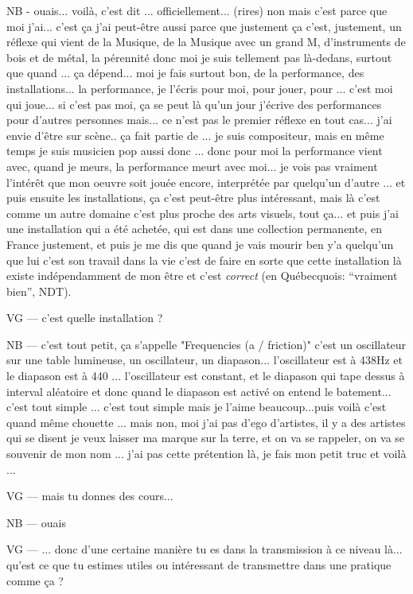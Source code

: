 NB - ouais... voilà, c'est dit ... officiellement... (rires) non mais c'est parce que moi j'ai... c'est ça j'ai peut-être aussi parce que justement ça c'est, justement, un réflexe qui vient de la Musique, de la Musique avec un grand M, d'instruments de bois et de métal, la pérennité donc moi je suis tellement pas là-dedans, surtout que quand ... ça dépend... moi je fais surtout bon, de la performance, des installations... la performance, je l'écris pour moi, pour jouer, pour ... c'est moi qui joue... si c'est pas moi, ça se peut là qu'un jour j'écrive des performances pour d'autres personnes mais... ce n'est pas le premier réflexe en tout cas...  j'ai envie d'être sur scène..  ça fait partie de ... je suis compositeur, mais  en même temps je suis musicien pop aussi donc ... donc pour moi la performance vient avec, quand je meurs, la performance meurt avec moi... je vois pas vraiment l'intérêt que mon oeuvre soit jouée encore, interprétée par quelqu'un d'autre ... et puis ensuite les installations, ça c'est peut-être plus intéressant, mais là c'est comme un autre domaine c'est plus proche des arts visuels, tout ça... et puis j'ai une installation qui a été achetée, qui est dans une collection permanente, en France justement, et puis je me dis que quand je vais mourir ben y'a quelqu'un que lui c'est son travail dans la vie c'est de faire en sorte que cette installation là existe indépendamment de mon être et c'est \textit{correct} (en Québecquois: ``vraiment bien'', NDT).

VG — c'est quelle installation ?

NB — c'est tout petit, ça s'appelle "Frequencies (a / friction)"  c'est un oscillateur sur une table lumineuse, un oscillateur, un diapason... l'oscillateur est à 438Hz et le diapason est à 440 ... l'oscillateur est constant, et le diapason qui tape dessus à interval aléatoire et donc quand le diapason est activé on entend le batement... c'est tout simple ... c'est tout simple mais je l'aime beaucoup...puis voilà c'est quand même chouette ... mais non, moi j'ai pas d'ego d'artistes, il y a des artistes qui se disent je veux laisser ma marque sur la terre, et on va se rappeler, on va se souvenir de mon nom ... j'ai pas cette prétention là, je fais mon petit truc et voilà ...

VG — mais tu donnes des cours...

NB — ouais

VG — ... donc d'une certaine manière tu es dans la transmission à ce niveau là... qu'est ce que tu estimes utiles ou intéressant de transmettre dans une pratique comme ça ?

